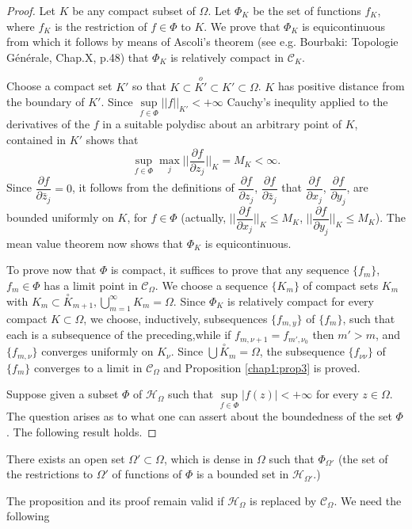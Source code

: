 \begin{proof}
Let $K$ be any compact subset of $\Omega$. Let $\Phi_K$ be the set of
functions $f_K$, where $f_K$ is the restriction of $f\in \Phi$ to
$K$. We prove that $\Phi_K$ is equicontinuous from which it follows by
means of Ascoli's theorem (see e.g. Bourbaki: Topologie G\'en\'erale,
Chap.X, p.48) that $\Phi_K$ is relatively compact in $\mathscr{C}_K$. 

Choose a compact set $K'$ so that $K\subset \overset{o}{K'} \subset K'
\subset \Omega$. $K$ has positive distance from the boundary of
$K'$. Since $\sup\limits_{f\in\Phi} ||f||_{K'} < + \infty$ Cauchy's
inequlity applied to the derivatives of the $f$ in a suitable polydisc
about an arbitrary point of $K$, contained in $K'$ shows that
$$
\sup\limits_{f\in \Phi} \max\limits_j ||\frac{\partial f}{\partial 
  z_j}||_K = M_K < \infty. 
$$
Since $\dfrac{\partial f}{\partial \bar{z}_j} = 0$, it follows from
the definitions of $\dfrac{\partial f}{\partial z_j}$,
$\dfrac{\partial f}{\partial \bar{z}_j}$ that $\dfrac{\partial
  f}{\partial x_j}$, $\dfrac{\partial f}{\partial y_j}$, are bounded
uniformly on $K$, for $f\in\Phi$ (actually, $||\dfrac{\partial
  f}{\partial x_j}||_K \leq M_K$, $||\dfrac{\partial f}{\partial
  y_j}||_K \leq M_K$). The mean value theorem now shows that $\Phi_K$
is equicontinuous. 

To prove now that $\Phi$ is compact, it suffices to prove that any
sequence $\{f_m\}$, $f_m \in \Phi$ has a limit point in
$\mathscr{C}_\Omega$. We choose a sequence $\{K_m\}$ of compact sets
$K_m$ with $K_m \subset \overset{\circ}{K}_{m+1}, \bigcup^\infty_{m=1}
K_m = \Omega$. Since $\Phi_K$ is relatively compact for every compact
$K\subset\Omega$, we choose, inductively, subsequences $\{f_{m,y}\}$
of $\{f_m\}$, such that each is a subsequence of the
preceding,\pageoriginale while if $f_{m,\nu+1} = f_{m',\nu_0}$ then
$m'>m$, and $\{f_{m,\nu}\}$ converges uniformly on $K_\nu$. Since
$\bigcup \overset{\circ}{K}_m = \Omega$, the subsequence
$\{f_{\nu\nu}\}$ of $\{f_m\}$ converges to a limit in
$\mathscr{C}_\Omega$ and Proposition \ref{chap1:prop3} is proved.

Suppose given a subset $\Phi$ of $\mathscr{H}_\Omega$ such that
$\sup\limits_{f\in\Phi} |f(z)| < + \infty $ for every $z\in
\Omega$. The question arises as to what one can assert about the
boundedness of the set $\Phi$. The following result holds.
\end{proof}

\begin{proposition}\label{chap1:prop4}
There exists an open set $\Omega' \subset \Omega$, which is dense in
$\Omega$ such that $\Phi_{\Omega'}$ (the set of the restrictions to
$\Omega'$ of functions of $\Phi$ is a bounded set in
$\mathscr{H}_{\Omega'}$.) 

The proposition and its proof remain valid if $\mathscr{H}_\Omega$ is
replaced by $\mathscr{C}_\Omega$. We need the following
\end{proposition}



